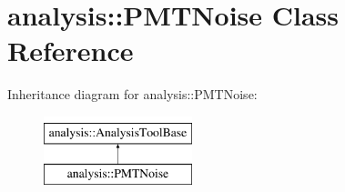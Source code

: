 \hypertarget{classanalysis_1_1PMTNoise}{\section{analysis\-:\-:P\-M\-T\-Noise Class Reference}
\label{classanalysis_1_1PMTNoise}
}
Inheritance diagram for analysis\-:\-:P\-M\-T\-Noise\-:\begin{figure}[H]
\begin{center}
\leavevmode
\includegraphics[height=2.000000cm]{classanalysis_1_1PMTNoise}
\end{center}
\end{figure}
